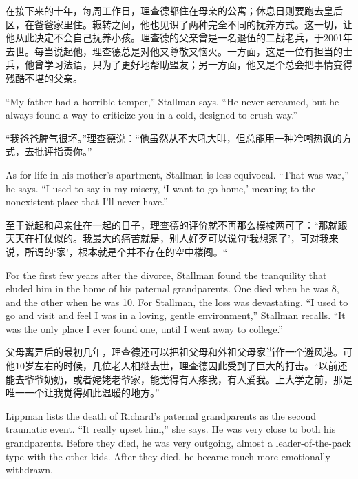 \ifdefined\chs
在接下来的十年，每周工作日，理查德都住在母亲的公寓；休息日则要跑去皇后区，在爸爸家里住。辗转之间，他也见识了两种完全不同的抚养方式。这一切，让他从此决定不会自己抚养小孩。理查德的父亲曾是一名退伍的二战老兵，于2001年去世。每当说起他，理查德总是对他又尊敬又恼火。一方面，这是一位有担当的士兵，他曾学习法语，只为了更好地帮助盟友；另一方面，他又是个总会把事情变得残酷不堪的父亲。
\fi

\ifdefined\eng
``My father had a horrible temper,'' Stallman says. ``He never screamed, but he always found a way to criticize you in a cold, designed-to-crush way.''
\fi

\ifdefined\chs
“我爸爸脾气很坏。”理查德说：“他虽然从不大吼大叫，但总能用一种冷嘲热讽的方式，去批评指责你。”
\fi

\ifdefined\eng
As for life in his mother's apartment, Stallman is less equivocal. ``That was war,'' he says. ``I used to say in my misery, `I want to go home,' meaning to the nonexistent place that I'll never have.''
\fi

\ifdefined\chs
至于说起和母亲住在一起的日子，理查德的评价就不再那么模棱两可了：“那就跟天天在打仗似的。我最大的痛苦就是，别人好歹可以说句‘我想家了’，可对我来说，所谓的‘家’，根本就是个并不存在的空中楼阁。“
\fi

\ifdefined\eng
For the first few years after the divorce, Stallman found the tranquility that eluded him in the home of his paternal grandparents. One died when he was 8, and the other when he was 10. For Stallman, the loss was devastating. ``I used to go and visit and feel I was in a loving, gentle environment,'' Stallman recalls. ``It was the only place I ever found one, until I went away to college.''
\fi

\ifdefined\chs
父母离异后的最初几年，理查德还可以把祖父母和外祖父母家当作一个避风港。可他10岁左右的时候，几位老人相继去世，理查德因此受到了巨大的打击。“以前还能去爷爷奶奶，或者姥姥老爷家，能觉得有人疼我，有人爱我。上大学之前，那是唯一一个让我觉得如此温暖的地方。”
\fi

\ifdefined\eng
Lippman lists the death of Richard's paternal grandparents as the second traumatic event. ``It really upset him,'' she says. He was very close to both his grandparents. Before they died, he was very outgoing, almost a leader-of-the-pack type with the other kids. After they died, he became much more emotionally withdrawn.
\fi

